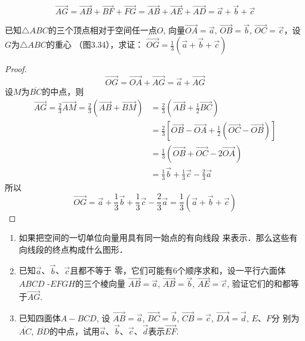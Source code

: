\begin{solution}
\[\Vec{AG}=\Vec{AB}+\Vec{BF}+\Vec{FG}=\Vec{AB}+\Vec{AE}+\Vec{AD}=\vec{a}+\vec{b}+\vec{c}\]
\end{solution}

\begin{example}
    已知$\triangle ABC$的三个顶点相对于空间任一点$O$, 
 向量$\Vec{OA}=\vec{a}$, $\vec{OB}=\vec{b}$, $\Vec{OC}=\vec{c}$，设$G$为$\triangle ABC$的重心
    （图3.34），求证：
$\Vec{OG}=\frac{1}{3}\left(\vec{a}+\vec{b}+\vec{c}\right)$
\end{example}

\begin{figure}[htp]
    \centering
{}
    \caption{}
\end{figure}


\begin{proof}
\[\Vec{OG}=\Vec{OA}+\Vec{AG}=\vec{a}+\Vec{AG}\]
设$M$为$\overline{BC}$的中点，则
\[\begin{split}
\Vec{AG}=\frac{2}{3}\Vec{AM}=\frac{2}{3}\left(\Vec{AB}+\Vec{BM}\right)&=\frac{2}{3}\left(\Vec{AB}+\frac{1}{2}\Vec{BC}\right)\\
&=\frac{2}{3}\left[\Vec{OB}-\Vec{OA}+\frac{1}{2}\left(\Vec{OC}-\Vec{OB}\right)\right]\\
&=\frac{1}{3}\left(\Vec{OB}+\Vec{OC}-2\Vec{OA}\right)\\
&=\frac{1}{3}\vec{b}+\frac{1}{3}\vec{c}-\frac{2}{3}\vec{a}
\end{split}\]
所以
\[\Vec{OG}=\vec{a}+\frac{1}{3}\vec{b}+\frac{1}{3}\vec{c}-\frac{2}{3}\vec{a}=\frac{1}{3}\left(\vec{a}+\vec{b}+\vec{c}\right)\]
\end{proof}

\begin{ex}
    \begin{enumerate}
        \item 如果把空间的一切单位向量用具有同一始点的有向线段
        来表示．那么这些有向线段的终点构成什么图形．
\item 已知$\vec{a}$、$\vec{b}$、$\vec{c}$且都不等于
零，它们可能有6个顺序求和，设一平行六面体$ABCD$
-$EFGH$的三个棱向量
$\Vec{AB}=\vec{a}$, $\Vec{AB}=\vec{b}$, $\Vec{AE}=\vec{c}$, 验证它们的和都等于$\Vec{AG}$.
\item 已知四面体$A-BCD$, 设
$\Vec{AB}=\vec{a}$, $\Vec{BC}=\vec{b}$, $\Vec{CB}=\vec{c}$, $\Vec{DA}=\vec{d}$, $E$、$F$分
别为$\overline{AC}$, $\overline{BD}$的中点，试用$\vec{a}$、$\vec{b}$、$\vec{c}$、$\vec{d}$表示$\Vec{EF}$.
    \end{enumerate}
\end{ex}

